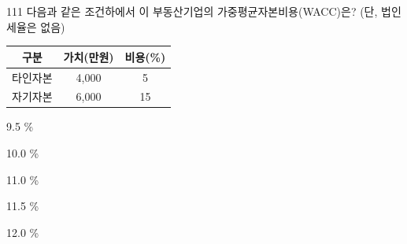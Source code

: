 \begin{question}{111}
다음과 같은 조건하에서 이 부동산기업의 가중평균자본비용(WACC)은? (단, 법인세율은 없음)
\par{\small\centering
\begin{tabular}{|c|c|c|}\hline
구분 & 가치(만원) & 비용(\%) \\ \hline
타인자본 & 4,000 & 5 \\ \hline
자기자본 & 6,000 & 15 \\ \hline
\end{tabular}\par}
\begin{choices}
  \item 9.5 \%
  \item 10.0 \%
  \item 11.0 \%
  \item 11.5 \%
  \item 12.0 \%
\end{choices}
\end{question}
